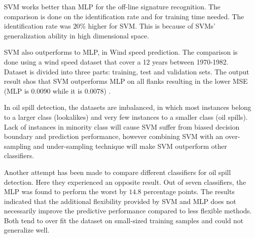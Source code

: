 SVM works better than MLP for the off-line signature recognition. The comparison is done on the identification rate and for training time needed. The identification rate was $20$\% higher for SVM. This is because of SVMs' generalization ability in high dimensional space\cite{FriasMartinez2006693}.

SVM also outperforms to MLP, in Wind speed prediction. The comparison is done using a wind speed dataset that cover a 12 years between 1970-1982. Dataset is divided into three parts: training, test and validation sets. The output result shos that SVM outperforms MLP on all flanks resulting in the lower MSE (MLP is 0.0090 while it is 0.0078) \cite{Mohandes2004939}.

In oil spill detection, the datasets are imbalanced, in which most instances belong to a larger class (lookalikes) and very few instances to a smaller class (oil spills). Lack of instances in minority class will cause SVM suffer from biased decision boundary and prediction performance, however combining SVM with an over-sampling and under-sampling technique will make SVM outperform other classifiers\cite{liu2006boosting}.


Another attempt has been made to compare different classifiers for oil spill detection.\cite{Xu201414} Here they experienced an opposite result. Out of seven classifiers, the MLP was found to perform the worst by $14.8$ percentage points. The results indicated that the additional flexibility provided by SVM and MLP does not necessarily improve the predictive performance compared to less flexible methods. Both tend to over fit the dataset on small-sized training samples and could not generalize well. 